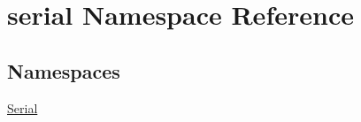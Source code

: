 \hypertarget{namespaceserial}{}\section{serial Namespace Reference}
\label{namespaceserial}
\subsection*{Namespaces}
\begin{DoxyCompactItemize}
\item 
 \hyperlink{namespaceserial_1_1_serial}{Serial}
\end{DoxyCompactItemize}
